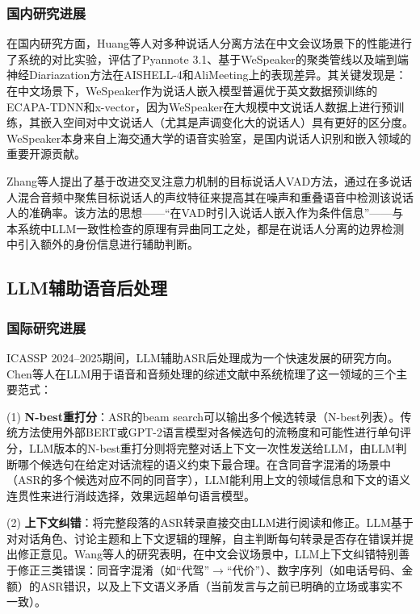 \documentclass[12pt, a4paper]{article}
\begin{document}
\subsubsection{国内研究进展}

在国内研究方面，Huang等人\cite{huang2024comparative}对多种说话人分离方法在中文会议场景下的性能进行了系统的对比实验，评估了Pyannote 3.1、基于WeSpeaker的聚类管线以及端到端神经Diariazation方法在AISHELL-4和AliMeeting上的表现差异。其关键发现是：在中文场景下，WeSpeaker\cite{wang2023wespeaker}作为说话人嵌入模型普遍优于英文数据预训练的ECAPA-TDNN和x-vector，因为WeSpeaker在大规模中文说话人数据上进行预训练，其嵌入空间对中文说话人（尤其是声调变化大的说话人）具有更好的区分度。WeSpeaker本身来自上海交通大学的语音实验室，是国内说话人识别和嵌入领域的重要开源贡献。

Zhang等人\cite{zhang2023target}提出了基于改进交叉注意力机制的目标说话人VAD方法，通过在多说话人混合音频中聚焦目标说话人的声纹特征来提高其在噪声和重叠语音中检测该说话人的准确率。该方法的思想——``在VAD时引入说话人嵌入作为条件信息''——与本系统中LLM一致性检查的原理有异曲同工之处，都是在说话人分离的边界检测中引入额外的身份信息进行辅助判断。

\subsection{LLM辅助语音后处理}

\subsubsection{国际研究进展}

ICASSP 2024--2025期间，LLM辅助ASR后处理成为一个快速发展的研究方向。Chen等人\cite{chen2024survey}在LLM用于语音和音频处理的综述文献中系统梳理了这一领域的三个主要范式：

(1) \textbf{N-best重打分}：ASR的beam search可以输出多个候选转录（N-best列表）。传统方法使用外部BERT或GPT-2语言模型对各候选句的流畅度和可能性进行单句评分，LLM版本的N-best重打分则将完整对话上下文一次性发送给LLM，由LLM判断哪个候选句在给定对话流程的语义约束下最合理。在含同音字混淆的场景中（ASR的多个候选对应不同的同音字），LLM能利用上文的领域信息和下文的语义连贯性来进行消歧选择，效果远超单句语言模型。

(2) \textbf{上下文纠错}：将完整段落的ASR转录直接交由LLM进行阅读和修正。LLM基于对对话角色、讨论主题和上下文逻辑的理解，自主判断每句转录是否存在错误并提出修正意见。Wang等人\cite{wang2024llm}的研究表明，在中文会议场景中，LLM上下文纠错特别善于修正三类错误：同音字混淆（如``代驾''$\rightarrow$``代价''）、数字序列（如电话号码、金额）的ASR错识，以及上下文语义矛盾（当前发言与之前已明确的立场或事实不一致）。
\end{document}
